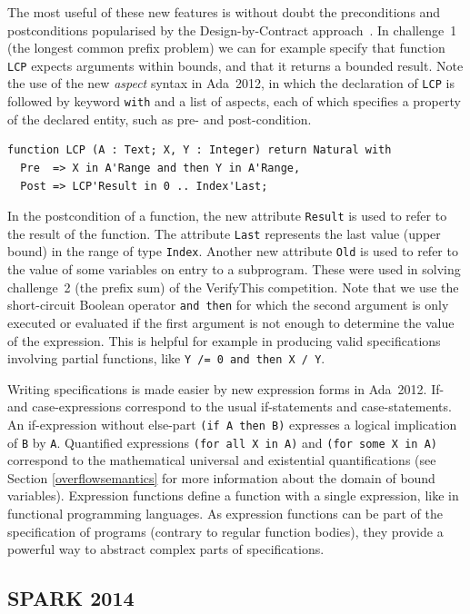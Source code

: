 \documentclass[sttt,final]{svjour}
\newcommand{\adatwtw}{Ada~2012\xspace}
\begin{document}
The most useful of these new features is without doubt the
preconditions and postconditions popularised by the Design-by-Contract
approach~\cite{meyer:1988:OSC}. In challenge~1 (the longest common
prefix problem) we can for example specify that function \verb|LCP|
expects arguments within bounds, and that it returns a bounded
result. Note the use of the new \textit{aspect} syntax in \adatwtw, in
which the declaration of \verb|LCP| is followed by keyword \verb|with|
and a list of aspects, each of which specifies a property of the declared
entity, such as pre- and post-condition.
%
\begin{lstlisting}
function LCP (A : Text; X, Y : Integer) return Natural with
  Pre  => X in A'Range and then Y in A'Range,
  Post => LCP'Result in 0 .. Index'Last;
\end{lstlisting}
%
In the postcondition of a function, the new attribute \verb|Result| is
used to refer to the result of the function. The attribute \verb|Last|
represents the last value (upper bound) in the range of type
\verb|Index|. Another new attribute \verb|Old| is used to refer to the
value of some variables on entry to a subprogram. These were used
in solving challenge~2 (the prefix sum) of the VerifyThis
competition. Note that we use the short-circuit Boolean operator
\verb|and then| for which the second argument is only executed or
evaluated if the first argument is not enough to determine the value
of the expression. This is helpful for example in producing valid
specifications involving partial functions, like
\verb|Y /= 0 and then X / Y|.

Writing specifications is made easier by new expression forms in
\adatwtw. If- and case-expressions correspond to the usual if-statements
and case-statements. An if-expression without else-part
\verb|(if A then B)| expresses a logical implication of \verb|B| by
\verb|A|. Quantified expressions \verb|(for all X in A)| and
\verb|(for some X in A)| correspond to the mathematical universal and
existential quantifications (see Section \ref{overflowsemantics} for more
information about the domain of bound variables). Expression functions
define a function with a single expression, like in functional programming
languages. As expression functions can be part of the specification of
programs (contrary to regular function bodies), they provide a powerful way
to abstract complex parts of specifications.

\subsection{SPARK 2014}
\end{document}
